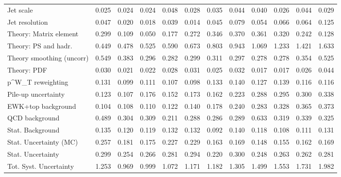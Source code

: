 \begin{tabular}{l|p{0.6cm}p{0.6cm}p{0.6cm}p{0.6cm}p{0.6cm}p{0.6cm}p{0.6cm}p{0.6cm}p{0.6cm}p{0.6cm}p{0.6cm}}
Jet scale                                & 0.025 & 0.024 & 0.024 & 0.048 & 0.028 & 0.035 & 0.044 & 0.040 & 0.026 & 0.044 & 0.029 \\
Jet resolution                           & 0.047 & 0.020 & 0.018 & 0.039 & 0.014 & 0.045 & 0.079 & 0.054 & 0.066 & 0.064 & 0.125 \\
Theory: Matrix element                   & 0.299 & 0.109 & 0.050 & 0.177 & 0.272 & 0.346 & 0.370 & 0.361 & 0.320 & 0.242 & 0.128 \\
Theory: PS and hadr.                     & 0.449 & 0.478 & 0.525 & 0.590 & 0.673 & 0.803 & 0.943 & 1.069 & 1.233 & 1.421 & 1.633 \\
Theory smoothing (uncorr)                & 0.549 & 0.383 & 0.296 & 0.282 & 0.299 & 0.311 & 0.297 & 0.278 & 0.278 & 0.354 & 0.525 \\
Theory: PDF                              & 0.030 & 0.021 & 0.022 & 0.028 & 0.031 & 0.025 & 0.032 & 0.017 & 0.017 & 0.026 & 0.044 \\
p^{W}_{T} reweighting                    & 0.131 & 0.099 & 0.111 & 0.107 & 0.098 & 0.133 & 0.140 & 0.127 & 0.139 & 0.116 & 0.116 \\
Pile-up uncertainty                      & 0.123 & 0.107 & 0.176 & 0.152 & 0.173 & 0.162 & 0.223 & 0.288 & 0.295 & 0.300 & 0.338 \\
EWK+top background                       & 0.104 & 0.108 & 0.110 & 0.122 & 0.140 & 0.178 & 0.240 & 0.283 & 0.328 & 0.365 & 0.373 \\
QCD background                           & 0.489 & 0.304 & 0.309 & 0.211 & 0.288 & 0.286 & 0.289 & 0.633 & 0.319 & 0.339 & 0.325 \\
Stat. Background                         & 0.135 & 0.120 & 0.119 & 0.132 & 0.132 & 0.092 & 0.140 & 0.118 & 0.108 & 0.111 & 0.131 \\
Stat. Uncertainty (MC)                   & 0.257 & 0.181 & 0.175 & 0.227 & 0.229 & 0.163 & 0.169 & 0.148 & 0.155 & 0.162 & 0.169 \\
\hline
Stat. Uncertainty                        & 0.299 & 0.254 & 0.266 & 0.281 & 0.294 & 0.220 & 0.300 & 0.248 & 0.263 & 0.262 & 0.281 \\
\hline
Tot. Syst. Uncertainty                   & 1.253 & 0.969 & 0.999 & 1.072 & 1.171 & 1.182 & 1.305 & 1.499 & 1.553 & 1.731 & 1.982 \\
\hline
\end{tabular}
